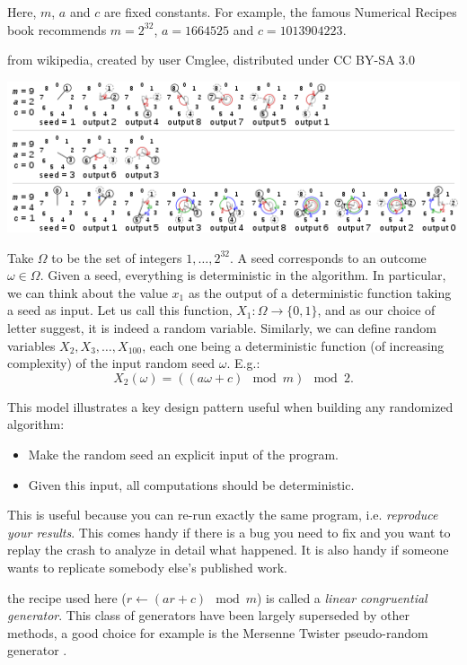 \documentclass{article}
\begin{document}
 Here, $m$, $a$ and $c$ are fixed constants. For example, the famous Numerical Recipes book \cite{press_numerical_2007} recommends $m = 2^{32}$, $a = 1664525$ and $c = 1013904223$.

 from wikipedia, created by user Cmglee, distributed under CC BY-SA 3.0

\begin{center}
\includegraphics[width=0.9\linewidth]{figures/pseudo-random}
\end{center}

 Take $\Omega$ to be the set of integers $1, \dots, 2^{32}$. A seed corresponds to an outcome $\omega \in \Omega$. Given a seed, everything is deterministic in the algorithm. In particular, we can think about the value $x_1$ as the output of a deterministic function taking a seed as input. Let us call this function, $X_1 : \Omega \to \{0, 1\}$, and as our choice of letter suggest, it is indeed a random variable. Similarly, we can define random variables $X_2, X_3, \dots, X_{100}$, each one being a deterministic function (of increasing complexity) of the input random seed $\omega$. E.g.:
\[ X_2(\omega) = ((a\omega + c) \mod m) \mod 2. \]

 This model illustrates a key design pattern useful when building any randomized algorithm: 
\begin{itemize}
	\item Make the random seed an explicit input of the program.
	\item Given this input, all computations should be deterministic.
\end{itemize}
This is useful because you can re-run exactly the same program, i.e. \emph{reproduce your results}. This comes handy if there is a bug you need to fix and you want to replay the crash to analyze in detail what happened. It is also handy if someone wants to replicate somebody else's published work.  

 the recipe used here ($r \gets (ar + c) \mod m$) is called a \emph{linear congruential generator}. This class of generators have been largely superseded by other methods, a good choice for example is the Mersenne Twister pseudo-random generator \cite{matsumoto_mersenne_1998}.
\end{document}
